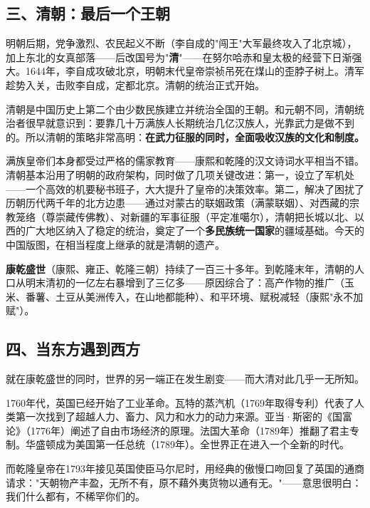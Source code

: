 \documentclass[a4paper,12pt]{ctexart}
\begin{document}
\subsection*{三、清朝：最后一个王朝}

明朝后期，党争激烈、农民起义不断（李自成的"闯王"大军最终攻入了北京城），加上东北的女真部落——后改国号为"\textbf{清}"——在努尔哈赤和皇太极的经营下日渐强大。1644年，李自成攻破北京，明朝末代皇帝崇祯吊死在煤山的歪脖子树上。清军趁势入关，击败李自成，定都北京。清朝的统治正式开始。

清朝是中国历史上第二个由少数民族建立并统治全国的王朝。和元朝不同，清朝统治者很早就意识到：要靠几十万满族人长期统治几亿汉族人，光靠武力是做不到的。所以清朝的策略非常高明：\textbf{在武力征服的同时，全面吸收汉族的文化和制度。}

满族皇帝们本身都受过严格的儒家教育——康熙和乾隆的汉文诗词水平相当不错。清朝基本沿用了明朝的政府架构，同时做了几项关键改进：第一，设立了军机处——一个高效的机要秘书班子，大大提升了皇帝的决策效率。第二，解决了困扰了历朝历代两千年的北方边患——通过对蒙古的联姻政策（满蒙联姻）、对西藏的宗教笼络（尊崇藏传佛教）、对新疆的军事征服（平定准噶尔），清朝把长城以北、以西的广大地区纳入了稳定的统治，奠定了一个\textbf{多民族统一国家}的疆域基础。今天的中国版图，在相当程度上继承的就是清朝的遗产。

\textbf{康乾盛世}（康熙、雍正、乾隆三朝）持续了一百三十多年。到乾隆末年，清朝的人口从明末清初的一亿左右暴增到了三亿多——原因综合了：高产作物的推广（玉米、番薯、土豆从美洲传入，在山地都能种）、和平环境、赋税减轻（康熙"永不加赋"）。

\subsection*{四、当东方遇到西方}

就在康乾盛世的同时，世界的另一端正在发生剧变——而大清对此几乎一无所知。

1760年代，英国已经开始了工业革命。瓦特的蒸汽机（1769年取得专利）代表了人类第一次找到了超越人力、畜力、风力和水力的动力来源。亚当·斯密的《国富论》（1776年）阐述了自由市场经济的原理。法国大革命（1789年）推翻了君主专制。华盛顿成为美国第一任总统（1789年）。全世界正在进入一个全新的时代。

而乾隆皇帝在1793年接见英国使臣马尔尼时，用经典的傲慢口吻回复了英国的通商请求："天朝物产丰盈，无所不有，原不藉外夷货物以通有无。"——意思很明白：我们什么都有，不稀罕你们的。
\end{document}
